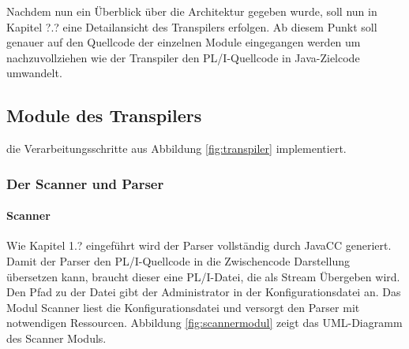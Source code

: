 Nachdem nun ein Überblick über die Architektur gegeben wurde, soll nun in Kapitel ?.? eine Detailansicht des Transpilers erfolgen.
Ab diesem Punkt soll genauer auf den Quellcode der einzelnen Module eingegangen werden um nachzuvollziehen wie der Transpiler den PL/I-Quellcode
in Java-Zielcode umwandelt.


 
\subsection{Module des Transpilers}
die Verarbeitungsschritte aus Abbildung \ref{fig:transpiler} implementiert.

\subsubsection{Der Scanner und Parser}
\paragraph{Scanner}
Wie Kapitel 1.? eingeführt wird der Parser vollständig durch JavaCC generiert.
Damit der Parser den PL/I-Quellcode in die Zwischencode Darstellung übersetzen kann,
braucht dieser eine PL/I-Datei, die als Stream Übergeben wird.
Den Pfad zu der Datei gibt der Administrator in der Konfigurationsdatei an.
Das Modul Scanner liest die Konfigurationsdatei und versorgt den Parser mit notwendigen Ressourcen.
Abbildung \ref{fig:scannermodul} zeigt das UML-Diagramm des Scanner Moduls.

